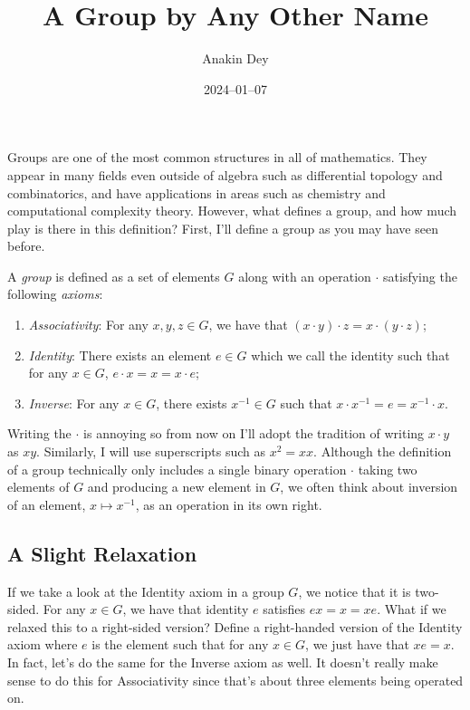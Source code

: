 \documentclass{article}
\title{A Group by Any Other Name}
\author{Anakin Dey}
\date{2024--01--07}
\begin{document}
\maketitle

Groups are one of the most common structures in all of mathematics.
They appear in many fields even outside of algebra such as differential topology and combinatorics, and have applications in areas such as chemistry and computational complexity theory.
However, what defines a group, and how much play is there in this definition?
First, I'll define a group as you may have seen before.

\begin{defn}\label{defn:grp}
  A \emph{group} is defined as a set of elements $G$ along with an operation $\cdot$ satisfying the following \emph{axioms}:
  \begin{enumerate}
  \item \emph{Associativity}: For any $x, y, z \in G$, we have that $(x \cdot y) \cdot z = x \cdot (y \cdot z)$;
  \item \emph{Identity}: There exists an element $e \in G$ which we call the identity such that for any $x \in G$, $e \cdot x = x = x \cdot e$;
  \item \emph{Inverse}: For any $x \in G$, there exists $x^{-1} \in G$ such that $x \cdot x^{-1} = e = x^{-1} \cdot x$.
  \end{enumerate}
\end{defn}

Writing the $\cdot$ is annoying so from now on I'll adopt the tradition of writing $x \cdot y$ as $xy$.
Similarly, I will use superscripts such as $x^{2} = xx$.
Although the definition of a group technically only includes a single binary operation $\cdot$ taking two elements of $G$ and producing a new element in $G$, we often think about inversion of an element, $x \mapsto x^{-1}$, as an operation in its own right.

\subsection*{A Slight Relaxation}

If we take a look at the Identity axiom in a group $G$, we notice that it is two-sided.
For any $x \in G$, we have that identity $e$ satisfies $ex = x = xe$.
What if we relaxed this to a right-sided version?
Define a right-handed version of the Identity axiom where $e$ is the element such that for any $x \in G$, we just have that $xe = x$.
In fact, let's do the same for the Inverse axiom as well.
It doesn't really make sense to do this for Associativity since that's about three elements being operated on.
\end{document}
